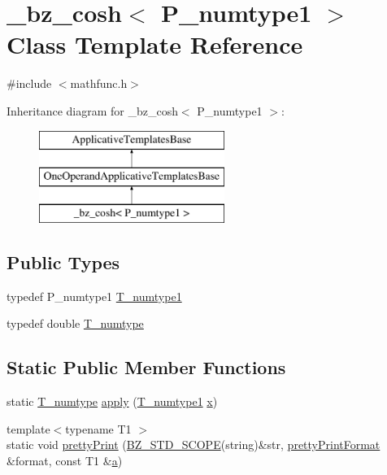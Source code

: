 \hypertarget{class__bz__cosh}{}\section{\+\_\+bz\+\_\+cosh$<$ P\+\_\+numtype1 $>$ Class Template Reference}
\label{class__bz__cosh}


{\ttfamily \#include $<$mathfunc.\+h$>$}

Inheritance diagram for \+\_\+bz\+\_\+cosh$<$ P\+\_\+numtype1 $>$\+:\begin{figure}[H]
\begin{center}
\leavevmode
\includegraphics[height=3.000000cm]{class__bz__cosh}
\end{center}
\end{figure}
\subsection*{Public Types}
\begin{DoxyCompactItemize}
\item 
typedef P\+\_\+numtype1 \hyperlink{class__bz__cosh_ae336c5727cf41abc0582be726f951bc3}{T\+\_\+numtype1}
\item 
typedef double \hyperlink{class__bz__cosh_a2536f8c06853c59364a80453421c6d4a}{T\+\_\+numtype}
\end{DoxyCompactItemize}
\subsection*{Static Public Member Functions}
\begin{DoxyCompactItemize}
\item 
static \hyperlink{class__bz__cosh_a2536f8c06853c59364a80453421c6d4a}{T\+\_\+numtype} \hyperlink{class__bz__cosh_a8b232e0c1d8b64b8200e60c9799d77ee}{apply} (\hyperlink{class__bz__cosh_ae336c5727cf41abc0582be726f951bc3}{T\+\_\+numtype1} \hyperlink{vecnorm1_8cc_ac73eed9e41ec09d58f112f06c2d6cb63}{x})
\item 
{\footnotesize template$<$typename T1 $>$ }\\static void \hyperlink{class__bz__cosh_a3eadd2513421dc3a63b4f9bc455fab8a}{pretty\+Print} (\hyperlink{numinquire_8h_a2b24ffc3b4ef9803956bc7715c6c7b83}{B\+Z\+\_\+\+S\+T\+D\+\_\+\+S\+C\+O\+P\+E}(string)\&str, \hyperlink{classprettyPrintFormat}{pretty\+Print\+Format} \&format, const T1 \&\hyperlink{gen__mat5files_8m_aae328bf20413f220e38aec4d95bfd6da}{a})
\end{DoxyCompactItemize}


